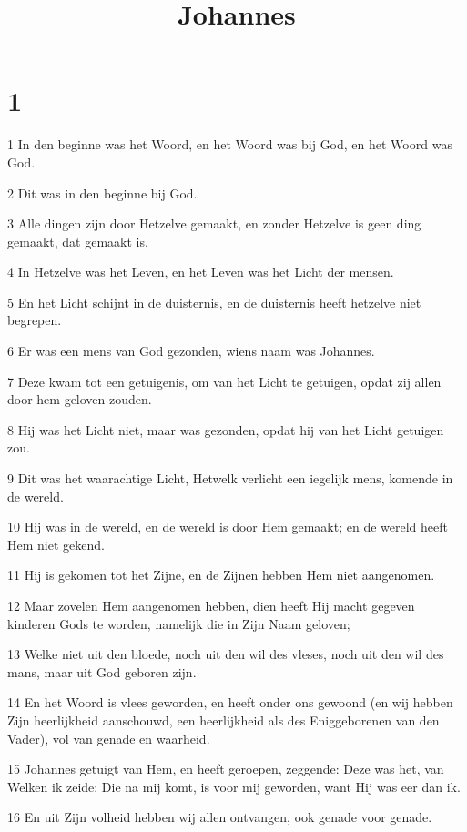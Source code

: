 

\title{Johannes}



\chapter{1}

\par 1 In den beginne was het Woord, en het Woord was bij God, en het Woord was God.
\par 2 Dit was in den beginne bij God.
\par 3 Alle dingen zijn door Hetzelve gemaakt, en zonder Hetzelve is geen ding gemaakt, dat gemaakt is.
\par 4 In Hetzelve was het Leven, en het Leven was het Licht der mensen.
\par 5 En het Licht schijnt in de duisternis, en de duisternis heeft hetzelve niet begrepen.
\par 6 Er was een mens van God gezonden, wiens naam was Johannes.
\par 7 Deze kwam tot een getuigenis, om van het Licht te getuigen, opdat zij allen door hem geloven zouden.
\par 8 Hij was het Licht niet, maar was gezonden, opdat hij van het Licht getuigen zou.
\par 9 Dit was het waarachtige Licht, Hetwelk verlicht een iegelijk mens, komende in de wereld.
\par 10 Hij was in de wereld, en de wereld is door Hem gemaakt; en de wereld heeft Hem niet gekend.
\par 11 Hij is gekomen tot het Zijne, en de Zijnen hebben Hem niet aangenomen.
\par 12 Maar zovelen Hem aangenomen hebben, dien heeft Hij macht gegeven kinderen Gods te worden, namelijk die in Zijn Naam geloven;
\par 13 Welke niet uit den bloede, noch uit den wil des vleses, noch uit den wil des mans, maar uit God geboren zijn.
\par 14 En het Woord is vlees geworden, en heeft onder ons gewoond (en wij hebben Zijn heerlijkheid aanschouwd, een heerlijkheid als des Eniggeborenen van den Vader), vol van genade en waarheid.
\par 15 Johannes getuigt van Hem, en heeft geroepen, zeggende: Deze was het, van Welken ik zeide: Die na mij komt, is voor mij geworden, want Hij was eer dan ik.
\par 16 En uit Zijn volheid hebben wij allen ontvangen, ook genade voor genade.

